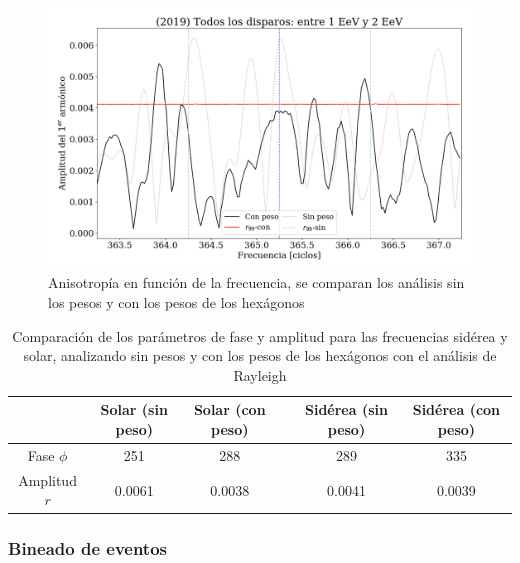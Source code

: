 		\begin{figure}[H]
			\centering
			\includegraphics[width=\linewidth]{pesos_sin_con_1_2_EeV.png}
			\caption{Anisotropía en función de la frecuencia, se comparan los análisis sin los pesos y con los pesos de los hexágonos}
		\end{figure}
		
		
		\begin{table}[H]
		\centering
		\begin{tabular}{c|c|c|c|c|c}
					& Solar (sin peso)	& Solar (con peso)	&& Sidérea (sin peso) 	& Sidérea (con peso)	 \\ \hline
		Fase $\phi$ & 251	    		& 288	    		&& 289				& 335				\\
		Amplitud $r$& 0.0061	    	& 0.0038	  		&& 0.0041			& 0.0039			\\
		\end{tabular}
		\caption{Comparación de los parámetros de fase y amplitud para las frecuencias sidérea y solar, analizando sin pesos y con los pesos de los hexágonos con el análisis de Rayleigh}
		\end{table}


\subsubsection{Bineado de eventos }


